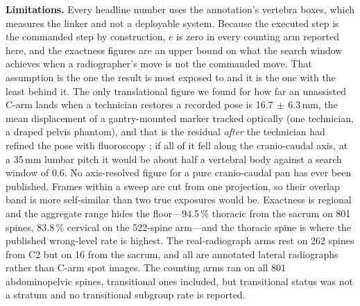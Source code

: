 \documentclass[11pt,letterpaper]{article}
\begin{document}
\textbf{Limitations.} Every headline number uses the annotation's vertebra boxes, which measures the linker
and not a deployable system. Because the executed step is the commanded step by construction, $e$ is zero
in every counting arm reported here, and the exactness figures are an upper bound on what the search
window achieves when a radiographer's move is not the commanded move. That assumption is the one the
result is most exposed to and it is the one with the least behind it. The only translational figure we
found for how far an unassisted C-arm lands when a technician restores a recorded pose is
16.7$\,\pm\,$6.3\,mm, the mean displacement of a gantry-mounted marker tracked optically (one
technician, a draped pelvis phantom), and that is the residual \emph{after} the technician had refined
the pose with fluoroscopy \citep{unberath2018}; if all of it fell along the cranio-caudal axis, at a
35\,mm lumbar pitch it would be about half a vertebral body against a search window of 0.6. No axis-resolved figure for a pure cranio-caudal pan has ever been published. Frames within a
sweep are cut from one projection, so their
overlap band is more self-similar than two true exposures would be. Exactness is regional and the aggregate
range hides the floor---94.5\,\% thoracic from the sacrum on 801 spines, 83.8\,\% cervical on the 522-spine
arm---and the thoracic spine is where the published wrong-level rate is highest. The real-radiograph arms
rest on 262 spines from C2 but on 16 from the sacrum, and all are annotated lateral radiographs rather than
C-arm spot images. The
counting arms ran on all 801 abdominopelvic spines, transitional ones included, but transitional status was
not a stratum and no transitional subgroup rate is reported.
\end{document}
